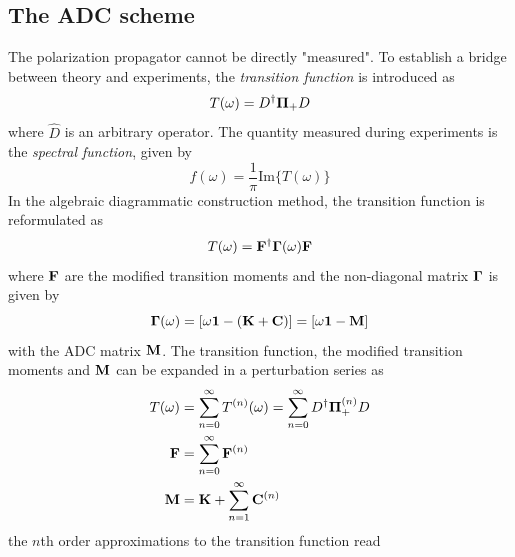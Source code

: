 \subsection{The ADC scheme}

The polarization propagator cannot be directly "measured". To establish a bridge between theory and experiments, the \emph{transition function} is introduced as
\begin{equation}
T(\omega) = D^{\dagger} \boldsymbol{\Pi}_{+} D 
\end{equation}
\noindent where $\hat{D}$ is an arbitrary operator. The quantity measured during experiments is the \emph{spectral function}, given by
\begin{equation}
f(\omega) = \frac{1}{\pi}\textrm{Im} \{T(\omega)\}
\end{equation}
In the algebraic diagrammatic construction method, the transition function is reformulated as
\begin{equation}
T(\omega) = \mathbf{F}^{\dagger} \mathbf{\Gamma}(\omega) \mathbf{F}
\end{equation}
\noindent where $\mathbf{F}$ are the modified transition moments and the non-diagonal matrix $\mathbf{\Gamma}$ is given by
\begin{equation}
\mathbf{\Gamma}(\omega) = \left[ \omega \mathbf{1} - (\mathbf{K} + \mathbf{C}) \right] = \left[ \omega \mathbf{1} - \mathbf{M} \right]
\end{equation}
\noindent with the ADC matrix $\mathbf{M}$. The transition function, the modified transition moments and $\mathbf{M}$ can be expanded in a perturbation series as
\begin{align}
T(\omega) &= \sum_{n=0}^{\infty} T^{(n)}(\omega) = \sum_{n=0}^{\infty} D^{\dagger} \boldsymbol{\Pi}_{+}^{(n)} D \\
\mathbf{F} &= \sum_{n=0}^{\infty} \mathbf{F}^{(n)} \\
\mathbf{M} &= \mathbf{K} + \sum_{n=1}^{\infty} \mathbf{C}^{(n)}
\end{align} 
\noindent the $n$th order approximations to the transition function read
